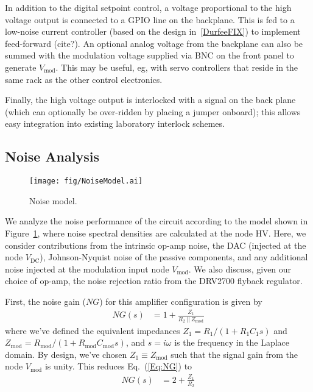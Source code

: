 \documentclass[aip,rsi,reprint]{revtex4-1} %
\newcommand{\epar}{~||~} %
\begin{document}
In addition to the digital setpoint control, a voltage proportional to the high voltage output is connected to a GPIO line on the backplane.
This is fed to a low-noise current controller (based on the design in~\ref{DurfeeFIX}) to implement feed-forward (cite?).
An optional analog voltage from the backplane can also be summed with the modulation voltage supplied via BNC on the front panel to generate $V_{\text{mod}}$.
This may be useful, eg, with servo controllers that reside in the same rack as the other control electronics.

Finally, the high voltage output is interlocked with a signal on the back plane (which can optionally be over-ridden by placing a jumper onboard); this allows easy integration into existing laboratory interlock schemes.

\subsection{Noise Analysis}
\label{Sec:NoiseAnalysis}

\begin{figure}[t]
\texttt{[image: fig/NoiseModel.ai]}
\caption{Noise model. \label{Fig:NoiseModel}}
\end{figure}

We analyze the noise performance of the circuit according to the model shown in Figure~\ref{Fig:NoiseModel}, where noise spectral densities are calculated at the node HV.
Here, we consider contributions from the intrinsic op-amp noise, the DAC (injected at the node $V_{\text{DC}}$), Johnson-Nyquist noise of the passive components, and any additional noise injected at the modulation input node $V_{\text{mod}}$.
We also discuss, given our choice of op-amp, the noise rejection ratio from the DRV2700 flyback regulator.

First, the noise gain ($NG$) for this amplifier configuration is given by
\begin{align}
\label{Eq:NG}
NG(s) &= 1 + \frac{Z_1}{R_2 \epar Z_{\text{mod}}}
\end{align}
where we've defined the equivalent impedances $Z_1 = R_1/(1+R_1 C_1 s)$ and $Z_{\text{mod}} = R_{\text{mod}}/(1+R_{\text{mod}} C_{\text{mod}} s)$, and $s = i\omega$ is the frequency in the Laplace domain.
By design, we've chosen $Z_1 \equiv Z_{\text{mod}}$ such that the signal gain from the node $V_{\text{mod}}$ is unity.
This reduces Eq.~(\ref{Eq:NG}) to
\begin{align}
\label{Eq:RedNG}
NG(s) &= 2 + \frac{Z_1}{R_2}
\end{align}
\end{document}
